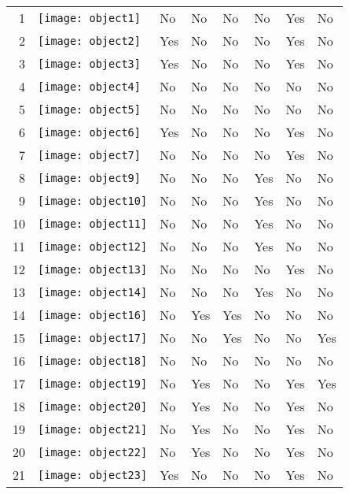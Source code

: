 \documentclass[12pt,final,twoside]{report}
\begin{document}
\begin{longtable}{rl*{6}{p{.08\linewidth}}}
1 & \texttt{[image: object1]} & No & No & No & No & Yes & No \\ 
2 & \texttt{[image: object2]} & Yes & No & No & No & Yes & No \\ 
3 & \texttt{[image: object3]} & Yes & No & No & No & Yes & No \\ 
4 & \texttt{[image: object4]} & No & No & No & No & No & No \\ 
5 & \texttt{[image: object5]} & No & No & No & No & No & No \\ 
6 & \texttt{[image: object6]} & Yes & No & No & No & Yes & No \\ 
7 & \texttt{[image: object7]} & No & No & No & No & Yes & No \\ 
8 & \texttt{[image: object9]} & No & No & No & Yes & No & No \\ 
9 & \texttt{[image: object10]} & No & No & No & Yes & No & No \\ 
10 & \texttt{[image: object11]} & No & No & No & Yes & No & No \\ 
11 & \texttt{[image: object12]} & No & No & No & Yes & No & No \\ 
12 & \texttt{[image: object13]} & No & No & No & No & Yes & No \\ 
13 & \texttt{[image: object14]} & No & No & No & Yes & No & No \\ 
14 & \texttt{[image: object16]} & No & Yes & Yes & No & No & No \\ 
15 & \texttt{[image: object17]} & No & No & Yes & No & No & Yes \\ 
16 & \texttt{[image: object18]} & No & No & No & No & No & No \\ 
17 & \texttt{[image: object19]} & No & Yes & No & No & Yes & Yes \\ 
18 & \texttt{[image: object20]} & No & Yes & No & No & Yes & No \\ 
19 & \texttt{[image: object21]} & No & Yes & No & No & Yes & No \\ 
20 & \texttt{[image: object22]} & No & Yes & No & No & Yes & No \\ 
21 & \texttt{[image: object23]} & Yes & No & No & No & Yes & No \\ 

\end{longtable}
\end{document}
